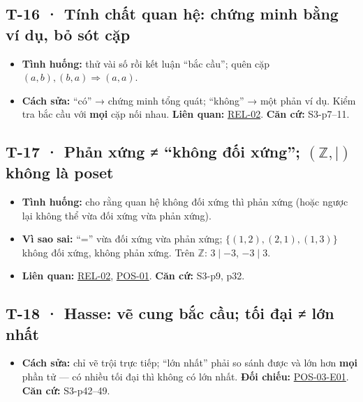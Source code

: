 \documentclass[
  10pt,
  twoside,openany]{book}
\providecommand{\tightlist}{%
  \setlength{\itemsep}{0pt}\setlength{\parskip}{0pt}}
\begin{document}
\hypertarget{T-16}{%
\subsection{T-16 · Tính chất quan hệ: chứng minh bằng ví dụ, bỏ sót
cặp}\label{T-16}}

\begin{itemize}
\tightlist
\item
  \textbf{Tình huống:} thử vài số rồi kết luận ``bắc cầu''; quên cặp
  \((a,b),(b,a)\Rightarrow(a,a)\).
\item
  \textbf{Cách sửa:} ``có'' → chứng minh tổng quát; ``không'' → một phản
  ví dụ. Kiểm tra bắc cầu với \textbf{mọi} cặp nối nhau. \textbf{Liên
  quan:} \protect\hyperlink{REL-02}{REL-02}. \textbf{Căn cứ:} S3-p7--11.
\end{itemize}

\hypertarget{T-17}{%
\subsection{\texorpdfstring{T-17 · Phản xứng ≠ ``không đối xứng'';
\((\mathbb Z,\mid)\) không là
poset}{T-17 · Phản xứng ≠ ``không đối xứng''; (\textbackslash mathbb Z,\textbackslash mid) không là poset}}\label{T-17}}

\begin{itemize}
\tightlist
\item
  \textbf{Tình huống:} cho rằng quan hệ không đối xứng thì phản xứng
  (hoặc ngược lại không thể vừa đối xứng vừa phản xứng).
\item
  \textbf{Vì sao sai:} ``='' vừa đối xứng vừa phản xứng;
  \(\{(1,2),(2,1),(1,3)\}\) không đối xứng, không phản xứng. Trên
  \(\mathbb Z\): \(3\mid-3\), \(-3\mid3\).
\item
  \textbf{Liên quan:} \protect\hyperlink{REL-02}{REL-02},
  \protect\hyperlink{POS-01}{POS-01}. \textbf{Căn cứ:} S3-p9, p32.
\end{itemize}

\hypertarget{T-18}{%
\subsection{T-18 · Hasse: vẽ cung bắc cầu; tối đại ≠ lớn
nhất}\label{T-18}}

\begin{itemize}
\tightlist
\item
  \textbf{Cách sửa:} chỉ vẽ trội trực tiếp; ``lớn nhất'' phải so sánh
  được và lớn hơn \textbf{mọi} phần tử --- có nhiều tối đại thì không có
  lớn nhất. \textbf{Đối chiếu:}
  \protect\hyperlink{POS-03-E01}{POS-03-E01}. \textbf{Căn cứ:}
  S3-p42--49.
\end{itemize}
\end{document}
